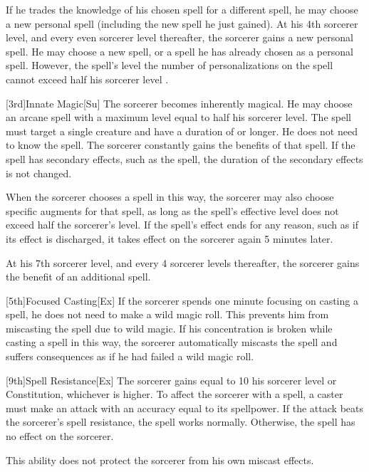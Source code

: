         If he trades the knowledge of his chosen spell for a different spell, he may choose a new personal spell (including the new spell he just gained).
        At his 4th sorcerer level, and every even sorcerer level thereafter, the sorcerer gains a new personal spell.
        He may choose a new spell, or a spell he has already chosen as a personal spell.
        However, the spell's level \add the number of personalizations on the spell cannot exceed half his sorcerer level .

        [3rd]{Innate Magic}[Su]
        The sorcerer becomes inherently magical.
        He may choose an arcane spell with a maximum level equal to half his sorcerer level.
        The spell must target a single creature and have a duration of \durshort or longer.
        He does not need to know the spell.
        The sorcerer constantly gains the benefits of that spell.
        If the spell has secondary effects, such as the  spell, the duration of the secondary effects is not changed.

        When the sorcerer chooses a spell in this way, the sorcerer may also choose specific augments for that spell, as long as the spell's effective level does not exceed half the sorcerer's level.
        If the spell's effect ends for any reason, such as if its effect is discharged, it takes effect on the sorcerer again 5 minutes later.

        At his 7th sorcerer level, and every 4 sorcerer levels thereafter, the sorcerer gains the benefit of an additional spell.

        [5th]{Focused Casting}[Ex]
        If the sorcerer spends one minute focusing on casting a spell, he does not need to make a wild magic roll.
        This prevents him from miscasting the spell due to wild magic.
        If his concentration is broken while casting a spell in this way, the sorcerer automatically miscasts the spell and suffers consequences as if he had failed a wild magic roll.

        [9th]{Spell Resistance}[Ex]
        The sorcerer gains  equal to 10 \add his sorcerer level or Constitution, whichever is higher.
        To affect the sorcerer with a spell, a caster must make an attack with an accuracy equal to its spellpower.
        If the attack beats the sorcerer's spell resistance, the spell works normally.
        Otherwise, the spell has no effect on the sorcerer.

        This ability does not protect the sorcerer from his own miscast effects.

